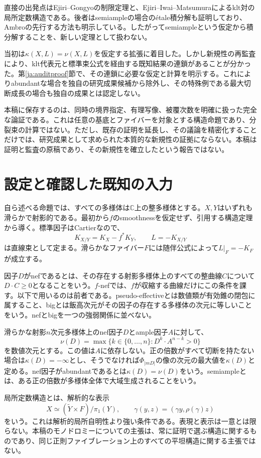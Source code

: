 \documentclass[12pt]{amsart}
\theoremstyle{definition}
\theoremstyle{remark}
\numberwithin{equation}{section}
\newcommand{\C}{\mathbb{C}}
\begin{document}
直接の出発点はEjiri--Gongyoの制限定理\cite{ja:EG}と、Ejiri--Iwai--Matsumuraによるklt対の局所定数構造\cite{ja:EIM}である。後者はsemiampleの場合のétale積分解も証明しており、Ambroの先行する方法も明示している。したがってsemiampleという仮定から積分解することを、新しい定理として扱わない。

当初は$\kappa(X,L)=\nu(X,L)$を仮定する拡張に着目した。しかし新規性の再監査により、klt代表元と標準束公式を経由する既知結果の連鎖があることが分かった。第\ref{ja:auditproof}節で、その連鎖に必要な仮定と計算を明示する。これによりabundantな場合を独自の研究成果候補から除外し、その特殊例である最大切断成長の場合も独自の成果とは認定しない。

本稿に保存するのは、同時の境界指定、有理写像、被覆次数を明確に扱った完全な論証である。これは任意の基底とファイバーを対象とする構造命題であり、分裂束の計算ではない。ただし、既存の証明を延長し、その議論を精密化することだけでは、研究成果として求められた本質的な新規性の証拠にならない。本稿は証明と監査の原稿であり、その新規性を確立したという報告ではない。

\section{設定と確認した既知の入力}\label{ja:setting}
自ら述べる命題では、すべての多様体は$\C$上の整多様体とする。$X,Y$はいずれも滑らかで射影的である。最初から$f$のsmoothnessを仮定せず、引用する構造定理から導く。標準因子はCartierなので、
\[
 K_{X/Y}=K_X-f^*K_Y,\qquad L=-K_{X/Y}
\]
は直線束として定まる。滑らかなファイバー$F$には随伴公式によって$L|_F=-K_F$が成立する。

因子$D$がnefであるとは、その存在する射影多様体上のすべての整曲線$C$について$D\cdot C\geq0$となることをいう。$f$-nefでは、$f$が収縮する曲線だけにこの条件を課す。以下で用いるのは前者である。pseudo-effectiveとは数値類が有効錐の閉包に属すること、bigとは飯高次元がその因子の存在する多様体の次元に等しいことをいう。nefとbigを一つの強弱関係に並べない。

滑らかな射影$n$次元多様体上のnef因子$D$とample因子$A$に対して、
\[
 \nu(D)=\max\{k\in\{0,\ldots,n\}:D^k\cdot A^{n-k}>0\}
\]
を数値次元とする。この値は$A$に依存しない。正の倍数がすべて切断を持たない場合は$\kappa(D)=-\infty$とし、そうでなければ$\Phi_{|mD|}$の像の次元の最大値を$\kappa(D)$と定める。nef因子がabundantであるとは$\kappa(D)=\nu(D)$をいう。semiampleとは、ある正の倍数が多様体全体で大域生成されることをいう。

局所定数構造とは、解析的な表示
\begin{equation}\label{ja:suspension}
 X\simeq(\widetilde Y\times F)/\pi_1(Y),\qquad
 \gamma(y,z)=(\gamma y,\rho(\gamma)z)
\end{equation}
をいう。これは解析的局所自明性より強い条件である。表現と表示は一意とは限らない。本稿のモノドロミーについての主張は、常に証明で選ぶ構造に関するものであり、同じ正則ファイブレーション上のすべての平坦構造に関する主張ではない。
\end{document}
